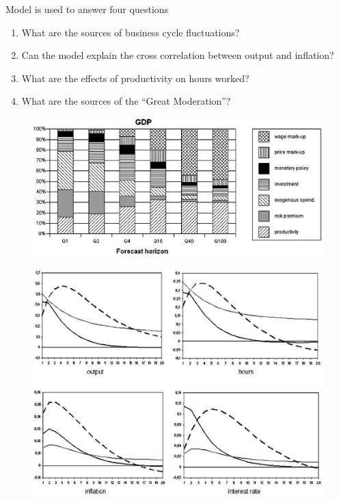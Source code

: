 \documentclass{beamer}
\begin{document}
\begin{frame}
  Model is used to answer four questions
  \begin{enumerate}
    \item What are the sources of business cycle fluctuations? 
    \item Can the model explain the cross correlation between output and inflation? 
    \item What are the effects of productivity on hours worked? 
    \item What are the sources of the “Great Moderation”?
  \end{enumerate}
\end{frame}


\begin{frame}
  \begin{figure}
    \includegraphics[scale=.8]{sw_figure1_gdp.eps}
  \end{figure}
\end{frame}

\begin{frame}
  \begin{figure}
    \includegraphics[scale=.8]{sw_figure2.eps}
  \end{figure}
\end{frame}
\end{document}
